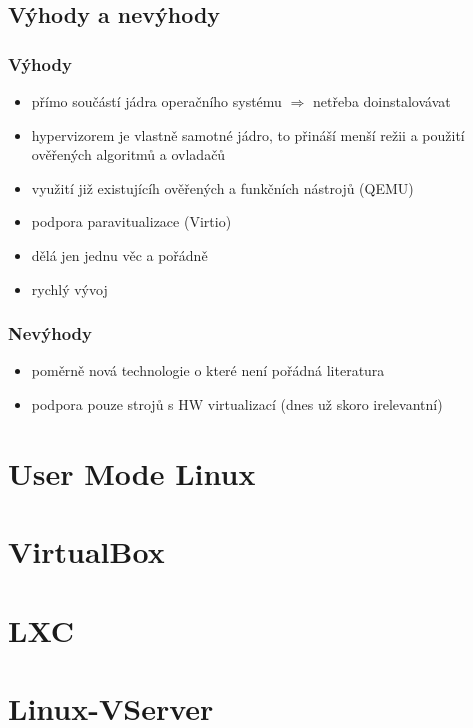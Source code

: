 \subsection{Výhody a nevýhody}
\subsubsection{Výhody}
\begin{itemize}
  \item přímo součástí jádra operačního systému $\Rightarrow$ netřeba doinstalovávat
  \item hypervizorem je vlastně samotné jádro, to přináší menší režii a použití ověřených algoritmů a ovladačů
  \item využití již existujícíh ověřených a funkčních nástrojů (QEMU)
  \item podpora paravitualizace (Virtio)
  \item dělá jen jednu věc a pořádně
  \item rychlý vývoj
\end{itemize}
\subsubsection{Nevýhody}
\begin{itemize}
  \item poměrně nová technologie o které není pořádná literatura
  \item podpora pouze strojů s HW virtualizací (dnes už skoro irelevantní)
\end{itemize}
\section{User Mode Linux}
\section{VirtualBox}
\section{LXC}
\section{Linux-VServer}
